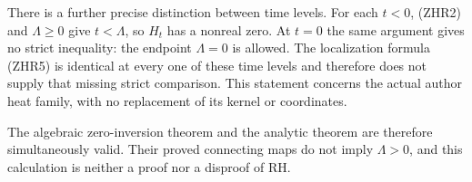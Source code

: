 There is a further precise distinction between time levels.
For each $t<0$, (ZHR2) and $\Lambda\ge0$ give $t<\Lambda$,
so $H_t$ has a nonreal zero. At $t=0$ the same argument gives
no strict inequality: the endpoint $\Lambda=0$ is allowed.
The localization formula (ZHR5) is identical at every one of
these time levels and therefore does not supply that missing
strict comparison. This statement concerns the actual author
heat family, with no replacement of its kernel or coordinates.

The algebraic zero-inversion theorem and the analytic theorem
are therefore simultaneously valid. Their proved connecting
maps do not imply $\Lambda>0$, and this calculation is neither
a proof nor a disproof of RH.
